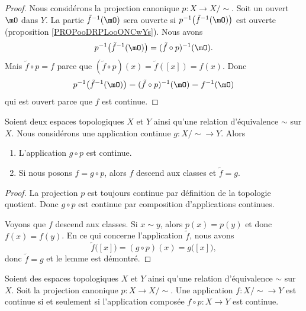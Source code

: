 \begin{proof}
	Nous considérons la projection canonique \( p\colon X\to X/\sim\). Soit un ouvert \( \mO\) dans \( Y\). La partie \( \tilde f^{-1}(\mO)\) sera ouverte si \( p^{-1}\big( \tilde f^{-1}(\mO) \big)\) est ouverte (proposition \ref{PROPooDRPLooONCwYs}). Nous avons
	\begin{equation}
		p^{-1}\big( \tilde f^{-1}(\mO) \big)=(\tilde f\circ p)^{-1}(\mO).
	\end{equation}
	Mais \( \tilde f\circ p=f\) parce que \( (\tilde f\circ p)(x)=\tilde f([x])=f(x)\). Donc
	\begin{equation}
		p^{-1}\big( \tilde f^{-1}(\mO) \big)=(\tilde f\circ p)^{-1}(\mO)=f^{-1}(\mO)
	\end{equation}
	qui est ouvert parce que \( f\) est continue.
\end{proof}


\begin{lemma}	\label{LEMooIGLQooIMSWYg}
	Soient deux espaces topologiques \( X\) et \( Y\) ainsi qu'une relation d'équivalence \( \sim\) sur \( X\). Nous considérons une application continue \( g\colon X/\sim\to Y\). Alors
	\begin{enumerate}
		\item
		      L'application \( g\circ p\) est continue.
		\item
		      Si nous posons \( f=g\circ p\), alors \( f\) descend aux classes et \( \tilde f=g\).
	\end{enumerate}
\end{lemma}

\begin{proof}
	La projection \( p\) est toujours continue par définition de la topologie quotient. Donc \( g\circ p\) est continue par composition d'applications continues.

	Voyons que \( f\) descend aux classes. Si \( x\sim y\), alors \( p(x)=p(y)\) et donc \( f(x)=f(y)\). En ce qui concerne l'application \( \tilde f\), nous avons
	\begin{equation}
		\tilde f\big( [x] \big)=(g\circ p)(x)=g\big( [x] \big),
	\end{equation}
	donc \( \tilde f=g\) et le lemme est démontré.
\end{proof}

\begin{proposition}       \label{PROPooYKLBooQuqnfA}
	Soient des espaces topologiques \( X\) et \( Y\) ainsi qu'une relation d'équivalence \( \sim\) sur \( X\). Soit la projection canonique \( p\colon X\to X/\sim\). Une application \( f\colon X/\sim\to Y\) est continue si et seulement si l'application composée \( f\circ p\colon X\to Y\) est continue.
\end{proposition}

